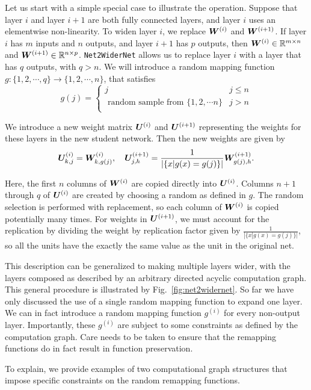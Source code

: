\documentclass{article} %
\begin{document}
Let us start with a simple special case to illustrate the operation.
Suppose that layer $i$ and layer $i+1$ are both fully connected layers, and
layer $i$ uses an elementwise non-linearity. To widen layer $i$, we replace ${\bm{W}}^{(i)}$ and ${\bm{W}}^{(i+1)}$.
If layer $i$ has $m$ inputs and $n$ outputs, and layer $i+1$ has $p$ outputs, then ${\bm{W}}^{(i)} \in {\mathbb{R}}^{m \times n}$ and
${\bm{W}}^{(i+1)} \in {\mathbb{R}}^{n \times p}$.
{\tt Net2WiderNet} allows us to replace layer $i$ with a layer that has $q$ outputs, with $q > n$.
We will introduce a random mapping function $g: \{1,2, \cdots, q\} \rightarrow \{1,2, \cdots, n\}$, that satisfies
\[
g(j) = \left\{
\begin{array}{ll}
j & j \leq n\\
\mbox{ random sample from } \{1,2,\cdots n\} & j > n\\
\end{array}
\right.
\]

We introduce a new weight matrix ${\bm{U}}^{(i)}$ and ${\bm{U}}^{(i+1)}$ representing
the weights for these layers in the new student network. Then the
new weights are given by
\[
	{\bm{U}}^{(i)}_{k,j} =  {\bm{W}}^{(i)}_{k, g(j)}, \ \ \ {\bm{U}}^{(i+1)}_{j,h} = \frac{1}{|\{x| g(x) = g(j)\}|} {\bm{W}}^{(i+1)}_{g(j), h}
    .
\]

Here, the first $n$ columns of ${\bm{W}}^{(i)}$ are copied directly into ${\bm{U}}^{(i)}$.
Columns $n+1$ through $q$ of ${\bm{U}}^{{(i)}}$ are created by choosing a random as defined in $g$.
The random selection is performed with replacement, so each column of ${\bm{W}}^{(i)}$ is copied potentially many times.
For weights in ${\bm{U}}^{(i+1)}$, we must account for the replication by dividing the weight by replication
factor given by $\frac{1}{|\{x| g(x) = g(j)\}|}$, so all the units have the exactly the same value as the unit in the original net.

This description can be generalized to making multiple layers wider, with the layers composed
as described by an arbitrary directed acyclic computation graph.
This general procedure is illustrated by Fig.~\ref{fig:net2widernet}.
So far we have only discussed the use of a single random mapping function to expand one layer.
We can in fact introduce a random mapping function $g^{(i)}$ for every non-output layer.
Importantly, these $g^{(i)}$ are subject to some constraints as defined by the computation graph.
Care needs to be taken to ensure that the remapping functions do in fact result in function
preservation.

To explain, we provide examples of two computational graph structures that impose specific constraints
on the random remapping functions.
\end{document}
